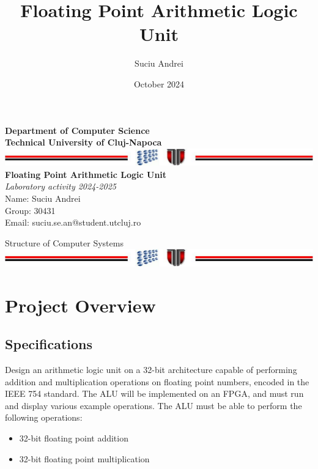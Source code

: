 \documentclass[a4paper,10pt]{article}
\title{Floating Point Arithmetic Logic Unit}
\author{Suciu Andrei}
\date{October 2024}
\begin{document}
    \setlength{\parindent}{0pt}
    \begin{titlepage}
        \begin{center}
            \textbf{\large Department of Computer Science} \\[0.2cm]
            \textbf{\large Technical University of Cluj-Napoca} \\[0.5cm]
            \includegraphics[width=1\textwidth]{utLogo.png} \\[1.0cm]

            \textbf{Floating Point Arithmetic Logic Unit} \\
            \textit{Laboratory activity 2024-2025} \\[4.0cm]

            Name: Suciu Andrei \\
            Group: 30431 \\
            Email: suciu.se.an@student.utcluj.ro\\

            \vfill

            Structure of Computer Systems\\[0.5cm]
            \includegraphics[width=1\textwidth]{utLogo.png} \\[4.0cm]


        \end{center}
    \end{titlepage}
    \newpage

    \tableofcontents
    \newpage


    \section{Project Overview}
    \subsection{Specifications}
    Design an arithmetic logic unit on a 32-bit architecture capable of performing addition and multiplication operations on floating point numbers, encoded in the IEEE 754 standard. The ALU will be implemented on an FPGA, and must run and display various example operations.
    The ALU must be able to perform the following operations:
    \begin{itemize}
        \item 32-bit floating point addition
        \item 32-bit floating point multiplication
    \end{itemize}
\end{document}
